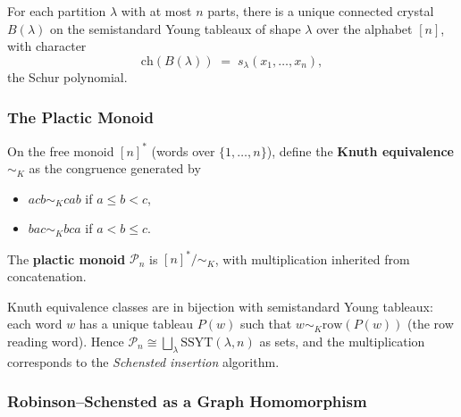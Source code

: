 \begin{theorem}\label{thm:crysrep}
For each partition $\lambda$ with at most $n$ parts, there is a
unique connected crystal $B(\lambda)$ on the semistandard Young
tableaux of shape $\lambda$ over the alphabet $[n]$, with character
\[
  \mathrm{ch}(B(\lambda)) \;=\; s_\lambda(x_1, \ldots, x_n),
\]
the Schur polynomial.
\end{theorem}

\subsubsection{The Plactic Monoid}

\begin{definition}
On the free monoid $[n]^*$ (words over $\{1, \ldots, n\}$), define the
\textbf{Knuth equivalence} $\sim_K$ as the congruence generated by
\begin{itemize}
  \item $acb \sim_K cab$ if $a \le b < c$,
  \item $bac \sim_K bca$ if $a < b \le c$.
\end{itemize}
\end{definition}

\begin{definition}
The \textbf{plactic monoid} $\mathcal P_n$ is $[n]^* / \sim_K$, with
multiplication inherited from concatenation.
\end{definition}

\begin{theorem}\label{thm:plactic}
Knuth equivalence classes are in bijection with semistandard Young
tableaux: each word $w$ has a unique tableau $P(w)$ such that
$w \sim_K \mathrm{row}(P(w))$ (the row reading word). Hence
$\mathcal P_n \cong \bigsqcup_{\lambda} \mathrm{SSYT}(\lambda, n)$ as
sets, and the multiplication corresponds to the
\emph{Schensted insertion} algorithm.
\end{theorem}

\subsubsection{Robinson--Schensted as a Graph Homomorphism}

